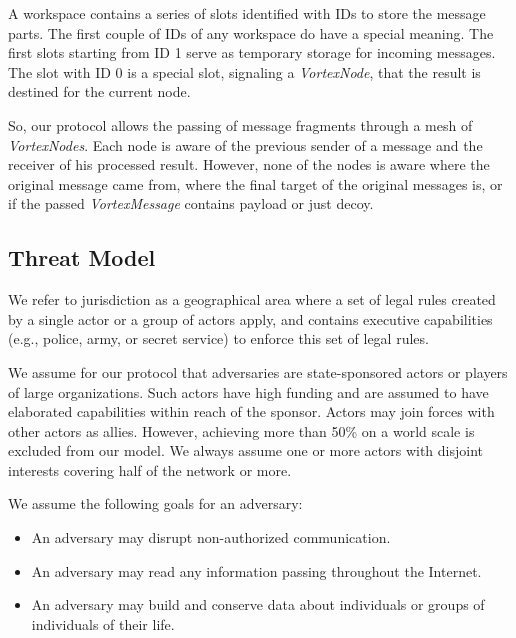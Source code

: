 \documentclass[acmsmall, screen]{acmart}
\begin{document}
A workspace contains a series of slots identified with IDs to store the message parts. The first couple of IDs of any workspace do have a special meaning. The first slots starting from ID 1 serve as temporary storage for incoming messages. The slot with ID 0 is a special slot, signaling a \emph{VortexNode}, that the result is destined for the current node.

So, our protocol allows the passing of message fragments through a mesh of \emph{VortexNodes}. Each node is aware of the previous sender of a message and the receiver of his processed result. However, none of the nodes is aware where the original message came from, where the final target of the original messages is, or if the passed \emph{VortexMessage} contains payload or just decoy. 

\subsection{Threat Model}
We refer to jurisdiction as a geographical area where a set of legal rules created by a single actor or a group of actors apply, and contains executive capabilities (e.g., police, army, or secret service) to enforce this set of legal rules.

We assume for our protocol that adversaries are state-sponsored actors or players of large organizations. Such actors have high funding and are assumed to have elaborated capabilities within reach of the sponsor. Actors may join forces with other actors as allies. However, achieving more than 50\% on a world scale is excluded from our model. We always assume one or more actors with disjoint interests covering half of the network or more. 

We assume the following goals for an adversary:
\begin{itemize}
	\item An adversary may disrupt non-authorized communication.
	\item An adversary may read any information passing throughout the Internet.
	\item An adversary may build and conserve data about individuals or groups of individuals of their life. 
\end{itemize}
\end{document}
